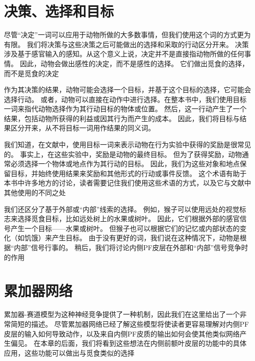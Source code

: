 \section{决策、选择和目标}

尽管“决定”一词可以应用于动物所做的大多数事情，但我们使用这个词的方式更为有限。
我们将决策与这些决策之后可能做出的选择和采取的行动区分开来\cite{Schall 2001}。
决策涉及基于感官输入的感知。从这个意义上说，决定并不是直接指动物所做的任何事情。
因此，动物会做出感性的决定，而不是感性的选择。
它们做出觅食的选择，而不是觅食的决定\par


作为其决策的结果，动物可能会选择一个目标，并基于这个目标的选择，它可能会选择行动。
或者，动物可以直接在动作中进行选择。在整本书中，我们使用目标一词来指代动物选择作为其行动目标的物体或位置。
然后，这一行动产生了一个结果，包括动物所获得的利益或因其行为而产生的成本。
因此，我们将目标与结果区分开来，从不将目标一词用作结果的同义词。\par


我们知道，在文献中，使用目标一词来表示动物在行为实验中获得的奖励是很常见的。
事实上，在这些实验中，奖励是动物的最终目标。
但为了获得奖励，动物通常必须选择一个物体或地点作为其行动的目标。
因此，我们为这些对象和地点保留目标，并始终使用结果来奖励和其他形式的行动或事件反馈。
这个术语有助于本书中许多地方的讨论，读者需要记住我们使用这些术语的方式，以及它与文献中其他使用的不同之处\par


我们还区分了基于外部或“内部”线索的选择\cite{Passingham et al.2010}。
例如，猴子可以使用远处的视觉标志来选择觅食目标，比如远处树上的水果或树叶。
因此，它们根据外部的感官信号产生一个目标——水果或树叶。
但猴子也可以根据它们的记忆或内部状态的变化（如饥饿）来产生目标。
由于没有更好的词，我们说在这种情况下，动物是根据“内部”信号行事的。
稍后，我们将讨论内侧PF皮层在外部和“内部”信号竞争时的作用\par



\section{累加器网络}

累加器-赛道模型为这种神经竞争提供了一种机制，因此我们在这里给出了一个非常简短的描述。
尽管累加器网络已经了解这些模型将使读者更容易理解对内侧PF皮层的输入如何导致动作，以及来自内侧PF皮质的输出如何会使其他类似网络产生偏见。
在本章的后面，我们将看到这些想法在内侧前额叶皮层的功能中的具体应用，这些功能可以做出与觅食类似的选择\par


